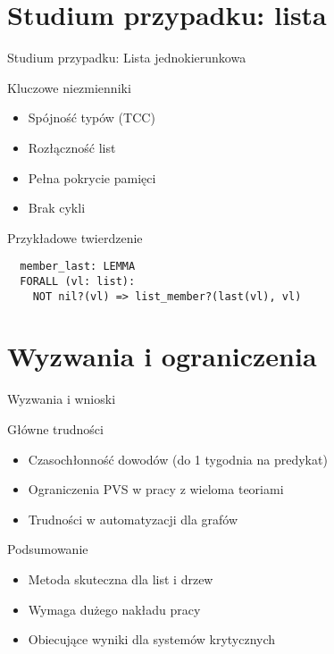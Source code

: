 \documentclass{beamer}
\begin{document}
\section{Studium przypadku: lista}
\begin{frame}[fragile]{Studium przypadku: Lista jednokierunkowa}
\begin{block}{Kluczowe niezmienniki}
\begin{itemize}
\item Spójność typów (TCC)
\item Rozłączność list
\item Pełna pokrycie pamięci
\item Brak cykli
\end{itemize}
\end{block}

\begin{exampleblock}{Przykładowe twierdzenie}
\begin{verbatim}
  member_last: LEMMA 
  FORALL (vl: list): 
    NOT nil?(vl) => list_member?(last(vl), vl)
\end{verbatim}
\end{exampleblock}
\end{frame}

\section{Wyzwania i ograniczenia}
\begin{frame}{Wyzwania i wnioski}
\begin{alertblock}{Główne trudności}
\begin{itemize}
\item Czasochłonność dowodów (do 1 tygodnia na predykat)
\item Ograniczenia PVS w pracy z wieloma teoriami
\item Trudności w automatyzacji dla grafów
\end{itemize}
\end{alertblock}

\begin{block}{Podsumowanie}
\begin{itemize}
\item Metoda skuteczna dla list i drzew
\item Wymaga dużego nakładu pracy
\item Obiecujące wyniki dla systemów krytycznych
\end{itemize}
\end{block}
\end{frame}
\end{document}
